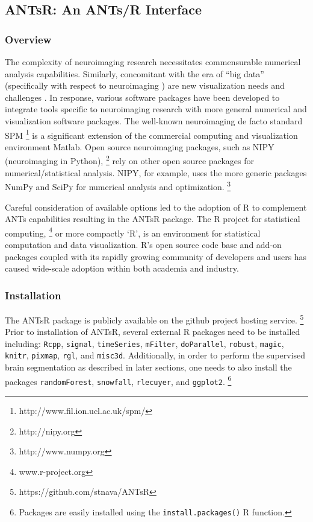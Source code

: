 \documentclass[final,5p,times,twocolumn]{elsarticle}
\begin{document}
\subsection{ANTsR:  An ANTs/R Interface}

\subsubsection{Overview}

The complexity of neuroimaging research necessitates 
commensurable numerical analysis capabilities.  Similarly, concomitant
with the era of ``big data'' (specifically with respect to neuroimaging
\citep{vanhorn2013}) are new visualization needs and challenges
\citep{childs2013,kehrer2013}.
In response, various software packages have been developed to
integrate tools specific to neuroimaging research with more general
numerical and visualization software packages.
The well-known neuroimaging de facto standard SPM%
\footnote{
http://www.fil.ion.ucl.ac.uk/spm/
}
is a significant extension of the commercial computing and visualization environment
Matlab.  Open source neuroimaging packages, such as NIPY (neuroimaging in Python),%
\footnote{
http://nipy.org
} 
rely on other open source packages for numerical/statistical analysis.  NIPY,
for example, uses the more generic packages NumPy and SciPy for numerical analysis and 
optimization.%
\footnote{
http://www.numpy.org
}  

Careful consideration of available options
led to the adoption of R to complement ANTs capabilities resulting in the
ANTsR package.
The R project for statistical computing,%
\footnote{
www.r-project.org
}
 or more compactly
`R', is an environment for statistical computation
and data visualization.  R's open source code base
and add-on packages coupled with its rapidly growing 
community of developers and users has caused wide-scale
adoption within both academia and industry.

\subsubsection{Installation}

The ANTsR package is publicly available on the github project hosting service.%
\footnote{
https://github.com/stnava/ANTsR
}
Prior to installation of ANTsR, several external R packages
need to be installed including: \verb#Rcpp#, \verb#signal#, \verb#timeSeries#, 
\verb#mFilter#, \verb#doParallel#, \verb#robust#, \verb#magic#, \verb#knitr#, \verb#pixmap#, 
\verb#rgl#, and \verb#misc3d#.  Additionally, in order
to perform the supervised brain segmentation as described 
in later sections, one needs to also install the packages
\verb#randomForest#, \verb#snowfall#, \verb#rlecuyer#,
and \verb#ggplot2#.%
\footnote{
Packages are easily installed using the {\tt install.packages()} R function.
} 
\end{document}
